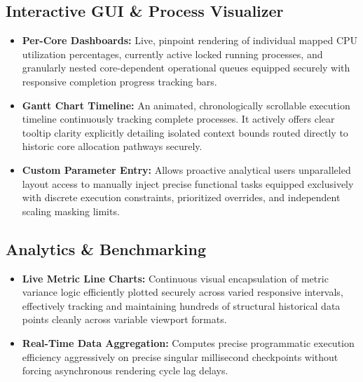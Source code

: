 \documentclass[a4paper]{article}
\begin{document}
\subsection{Interactive GUI \& Process Visualizer}
\begin{itemize}[noitemsep]
    \item \textbf{Per-Core Dashboards:} Live, pinpoint rendering of individual mapped CPU utilization percentages, currently active locked running processes, and granularly nested core-dependent operational queues equipped securely with responsive completion progress tracking bars.
    \item \textbf{Gantt Chart Timeline:} An animated, chronologically scrollable execution timeline continuously tracking complete processes. It actively offers clear tooltip clarity explicitly detailing isolated context bounds routed directly to historic core allocation pathways securely.
    \item \textbf{Custom Parameter Entry:} Allows proactive analytical users unparalleled layout access to manually inject precise functional tasks equipped exclusively with discrete execution constraints, prioritized overrides, and independent scaling masking limits.
\end{itemize}

\subsection{Analytics \& Benchmarking}
\begin{itemize}[noitemsep]
    \item \textbf{Live Metric Line Charts:} Continuous visual encapsulation of metric variance logic efficiently plotted securely across varied responsive intervals, effectively tracking and maintaining hundreds of structural historical data points cleanly across variable viewport formats.
    \item \textbf{Real-Time Data Aggregation:} Computes precise programmatic execution efficiency aggressively on precise singular millisecond checkpoints without forcing asynchronous rendering cycle lag delays.
\end{itemize}
\end{document}
